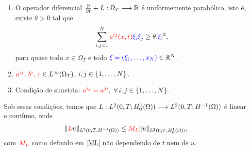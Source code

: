 \begin{frame}{}

\begin{hipoteses}\label{hp}
\begin{enumerate}[a]
\item  O operador diferencial
{\color{red}\(\frac{\partial}{\partial t}+L:\Omega_T\longrightarrow \mathbb{R} \)} é {\color{blue}uniformemente parabólico}, isto é, existe \(\theta>0\) tal que
\[
\sum_{i,j=1}^{N} {\color{red}a^{ij}(x,t)}{\color{blue}\xi_i\xi_j}\geq \theta |{\color{blue}\xi}|^2,
\]
para quase todo \(x\in \Omega_T\) e todo \({\color{blue}\xi=(\xi_1,\ldots,x_N)}\in \mathbb{R}^N\). 
\item \({\color{red}a^{ij},\, b^i, \, c}\in L^\infty(\Omega_T)\), \(i,j\in \{1,\ldots,N\}\).
\item {Condição de simetria}:
\({\color{red}a^{ij}=a^{ji}},\ \forall\, i,j\in \{1,\ldots,N\}.\)
\end{enumerate}
\end{hipoteses}
Sob essas condições, temos que {\color{red}\(L: L^2(0,T;H_0^1(\Omega))\longrightarrow 
L^2(0,T;H^{-1}(\Omega))\)} é linear e contínuo, onde
\[
\lVert{\color{red}L}u\rVert_{L^2(0,T;H^{-1}(\Omega))}\leq {\color{red}M_L} \lVert u\rVert_{L^2(0,T;H_0^1(\Omega))},
\]
\quad com \({\color{red}M_L}\) como definido em \eqref{ML} não dependendo de \(t\) nem de \(u\).
\end{frame}
